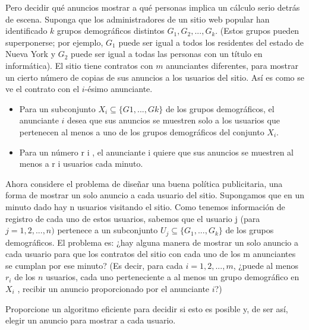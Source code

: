 \documentclass{article}
\begin{document}
Pero decidir qué anuncios mostrar a qué personas implica un cálculo serio detrás
de escena. Suponga que los administradores de un sitio web popular han
identificado $k$ grupos demográficos distintos $G_1, G_2, . . . , G_k$. (Estos
grupos pueden superponerse; por ejemplo, $G_1$ puede ser igual a todos los
residentes del estado de Nueva York y $G_2$ puede ser igual a todas las personas
con un título en informática). El sitio tiene contratos con $m$ anunciantes
diferentes, para mostrar un cierto número de copias de sus anuncios a los
usuarios del sitio. Así es como se ve el contrato con el $i$-ésimo anunciante.

\begin{itemize}

\item  Para un subconjunto $X_i \subseteq \{G 1 , . . . , G k \}$ de los grupos
demográficos, el anunciante $i$ desea que sus anuncios se muestren solo a los
usuarios que pertenecen al menos a uno de los grupos demográficos del conjunto
$X_i$.

\item Para un número r i , el anunciante i quiere que sus anuncios se muestren
al menos a r i usuarios cada minuto.

\end{itemize}

Ahora considere el problema de diseñar una buena política publicitaria, una
forma de mostrar un solo anuncio a cada usuario del sitio. Supongamos que en un
minuto dado hay n usuarios visitando el sitio. Como tenemos información de
registro de cada uno de estos usuarios, sabemos que el usuario j (para $j = 1, 2,
. . . , n)$ pertenece a un subconjunto $U_j \subseteq \{G_1 , . . . , G_k \}$ de los grupos
demográficos. El problema es: ¿hay alguna manera de mostrar un solo anuncio a
cada usuario para que los contratos del sitio con cada uno de los m anunciantes
se cumplan por ese minuto? (Es decir, para cada $i = 1, 2, . . . , m$, ¿puede al
menos $r_i$ de los $n$ usuarios, cada uno perteneciente a al menos un grupo
demográfico en $X_i$ , recibir un anuncio proporcionado por el anunciante $i$?)

Proporcione un algoritmo eficiente para decidir si esto es posible y, de ser
así, elegir un anuncio para mostrar a cada usuario.
\end{document}
